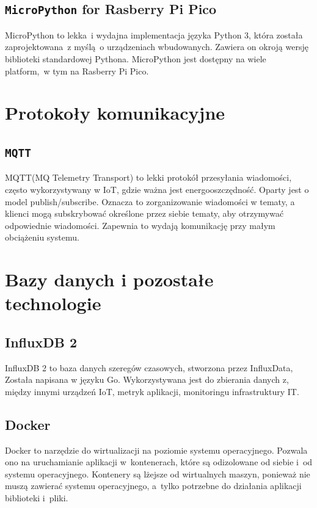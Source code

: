\subsection{\texttt{MicroPython} for Rasberry Pi Pico}
MicroPython to lekka~i wydajna implementacja języka Python 3, która została zaprojektowana~z myślą~o urządzeniach wbudowanych. Zawiera on okroją wersję biblioteki standardowej Pythona. MicroPython jest dostępny na wiele platform,~w tym na Rasberry Pi Pico.~\cite{PICO:micropython}

\section{Protokoły komunikacyjne}

\subsection{\texttt{MQTT}}
MQTT(MQ Telemetry Transport) to lekki protokół przesyłania wiadomości, często wykorzystywany w IoT, gdzie ważna jest energooszczędność. Oparty jest o model publish/subscribe. Oznacza to zorganizowanie wiadomości w tematy, a klienci mogą subskrybować określone przez siebie tematy, aby otrzymywać odpowiednie wiadomości. Zapewnia to wydają komunikację przy małym obciążeniu systemu.~\cite{protocol:mqtt}

\section{Bazy danych i pozostałe technologie}
\subsection{InfluxDB 2}
InfluxDB 2 to baza danych szeregów czasowych, stworzona przez InfluxData, Została napisana w języku Go. Wykorzystywana jest do zbierania danych z, między innymi urządzeń IoT, metryk aplikacji, monitoringu infrastruktury IT.~\cite{tool:influxdb}

\subsection{Docker}
Docker to narzędzie do wirtualizacji na poziomie systemu operacyjnego. Pozwala ono na uruchamianie aplikacji w~kontenerach, które są odizolowane od siebie i~od systemu operacyjnego. Kontenery są lżejsze od wirtualnych maszyn, ponieważ nie muszą zawierać systemu operacyjnego, a~tylko potrzebne do działania aplikacji biblioteki i~pliki.~\cite{tool:docker}

